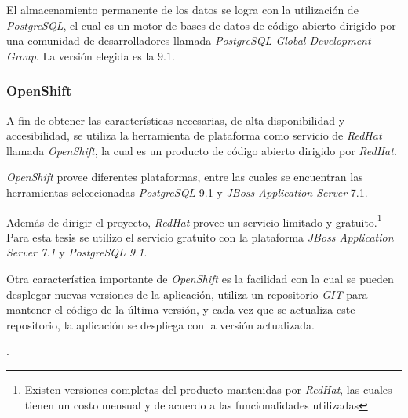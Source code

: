 El almacenamiento permanente de los datos se logra con la utilización de
\textit{PostgreSQL}, el cual es un motor de bases de datos de código abierto
dirigido por una comunidad de desarrolladores llamada \textit{PostgreSQL Global
    Development Group}. La versión elegida es la $9.1$.

\subsubsection{OpenShift}

A fin de obtener las características necesarias, de alta disponibilidad y
accesibilidad, se utiliza la herramienta de plataforma como servicio de
\textit{RedHat} llamada \textit{OpenShift}, la cual es un producto de código
abierto dirigido por \textit{RedHat}.

\textit{OpenShift} provee diferentes plataformas, entre las cuales se encuentran
las herramientas seleccionadas \textit{PostgreSQL} 9.1 y \textit{JBoss
    Application Server} 7.1.

Además de dirigir el proyecto, \textit{RedHat} provee un servicio limitado y
gratuito\cite{openshift:pricing}.\footnote{Existen versiones completas del
    producto mantenidas por \textit{RedHat}, las cuales tienen un costo mensual
    y de acuerdo a las funcionalidades utilizadas\cite{openshift:pricing}} Para
esta tesis se utilizo el servicio gratuito con la plataforma \textit{JBoss
    Application Server 7.1} y \textit{PostgreSQL 9.1}.

Otra característica importante de \textit{OpenShift} es la facilidad con la cual
se pueden desplegar nuevas versiones de la aplicación, utiliza un repositorio
\textit{GIT} para mantener el código de la última versión, y cada vez que se
actualiza este repositorio, la aplicación se despliega con la versión
actualizada.

.
